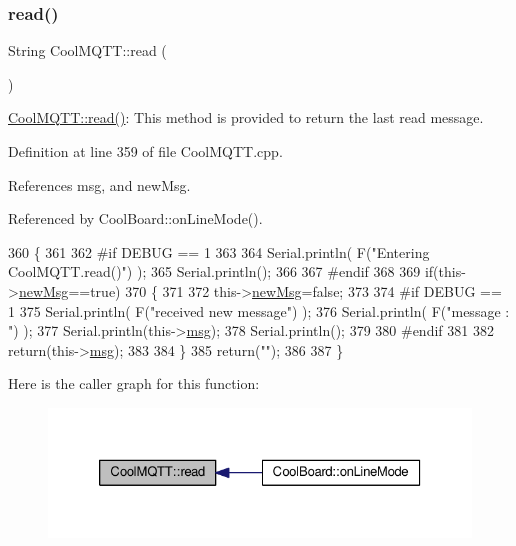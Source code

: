 \subsubsection{\texorpdfstring{read()}{read()}}
{\footnotesize\ttfamily String Cool\+M\+Q\+T\+T\+::read (\begin{DoxyParamCaption}{ }\end{DoxyParamCaption})}

\hyperlink{classCoolMQTT_ae3c18f6ae9723746d32765f1c8f176ca}{Cool\+M\+Q\+T\+T\+::read()}\+: This method is provided to return the last read message. 

Definition at line 359 of file Cool\+M\+Q\+T\+T.\+cpp.



References msg, and new\+Msg.



Referenced by Cool\+Board\+::on\+Line\+Mode().


\begin{DoxyCode}
360 \{   
361 
362 \textcolor{preprocessor}{#if DEBUG == 1 }
363 
364     Serial.println( F(\textcolor{stringliteral}{"Entering CoolMQTT.read()"}) );
365     Serial.println();
366 
367 \textcolor{preprocessor}{#endif }
368 
369     \textcolor{keywordflow}{if}(this->\hyperlink{classCoolMQTT_a3240388137b885775aadf38e96b24c6b}{newMsg}==\textcolor{keyword}{true})
370     \{
371         
372         this->\hyperlink{classCoolMQTT_a3240388137b885775aadf38e96b24c6b}{newMsg}=\textcolor{keyword}{false};
373 
374 \textcolor{preprocessor}{#if DEBUG == 1 }
375         Serial.println( F(\textcolor{stringliteral}{"received new message"}) );
376         Serial.println( F(\textcolor{stringliteral}{"message : "}) );
377         Serial.println(this->\hyperlink{classCoolMQTT_af6b19e7074dbbb4ae493c44dcb53f7ff}{msg});
378         Serial.println();
379 
380 \textcolor{preprocessor}{#endif}
381 
382         \textcolor{keywordflow}{return}(this->\hyperlink{classCoolMQTT_af6b19e7074dbbb4ae493c44dcb53f7ff}{msg});
383         
384     \}
385     \textcolor{keywordflow}{return}(\textcolor{stringliteral}{""});
386 
387 \}
\end{DoxyCode}
Here is the caller graph for this function\+:
\nopagebreak
\begin{figure}[H]
\begin{center}
\leavevmode
\includegraphics[width=326pt]{classCoolMQTT_ae3c18f6ae9723746d32765f1c8f176ca_icgraph}
\end{center}
\end{figure}
\mbox{\label{classCoolMQTT_a5d003307eff78efbd585e42b43b72b6d}} 
